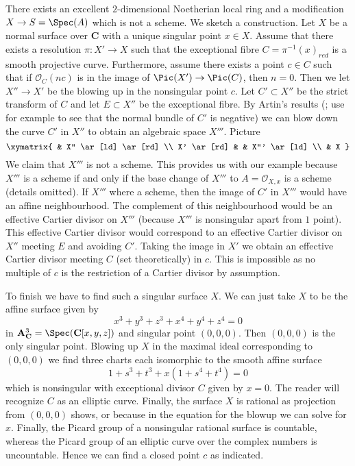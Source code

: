 \begin{example}
\label{example-not-blow-up}
There exists an excellent $2$-dimensional Noetherian local ring
and a modification $X \to S = \Spec(A)$ which is not a scheme.
We sketch a construction. Let $X$ be a normal surface over $\mathbf{C}$
with a unique singular point $x \in X$. Assume that there exists a
resolution $\pi : X' \to X$ such that the exceptional fibre
$C = \pi^{-1}(x)_{red}$ is a smooth projective curve. Furthermore, assume
there exists a point $c \in C$ such that if $\mathcal{O}_C(nc)$
is in the image of $\Pic(X') \to \Pic(C)$, then $n = 0$.
Then we let $X'' \to X'$ be the blowing up in the nonsingular point $c$.
Let $C' \subset X''$ be the strict transform of $C$ and let $E \subset X''$
be the exceptional fibre. By Artin's results
(\cite{ArtinII}; use for example \cite{Mumford-topology}
to see that the normal bundle of $C'$ is negative)
we can blow down the curve $C'$ in $X''$ to obtain an algebraic space $X'''$.
Picture
$$
\xymatrix{
& X'' \ar[ld] \ar[rd] \\
X' \ar[rd] &  & X''' \ar[ld] \\
& X
}
$$
We claim that $X'''$ is not a scheme. This provides us with our example
because $X'''$ is a scheme if and only if the base change of $X'''$
to $A = \mathcal{O}_{X, x}$ is a scheme (details omitted).
If $X'''$ where a scheme, then the image of $C'$ in $X'''$ would
have an affine neighbourhood. The complement of this neighbourhood
would be an effective Cartier divisor on $X'''$ (because $X'''$ is
nonsingular apart from $1$ point). This effective Cartier divisor would
correspond to an effective Cartier divisor on $X''$
meeting $E$ and avoiding $C'$. Taking the image in $X'$ we obtain
an effective Cartier divisor meeting $C$ (set theoretically) in $c$.
This is impossible as no multiple of $c$ is the restriction of a Cartier
divisor by assumption.

\medskip\noindent
To finish we have to find such a singular surface $X$. We can just take
$X$ to be the affine surface given by
$$
x^3 + y^3 + z^3 + x^4 + y^4 + z^4 = 0
$$
in $\mathbf{A}^3_\mathbf{C} = \Spec(\mathbf{C}[x, y, z])$ and singular point
$(0, 0, 0)$. Then $(0, 0, 0)$ is the only singular point. Blowing up $X$
in the maximal ideal corresponding to $(0, 0, 0)$ we find three charts each
isomorphic to the smooth affine surface
$$
1 + s^3 + t^3 + x(1 + s^4 + t^4) = 0
$$
which is nonsingular with exceptional divisor $C$ given by $x = 0$. The reader
will recognize $C$ as an elliptic curve. Finally, the surface $X$ is rational
as projection from $(0, 0, 0)$ shows, or because in the equation for the
blowup we can solve for $x$. Finally, the Picard group of a nonsingular
rational surface is countable, whereas the Picard group of an elliptic
curve over the complex numbers is uncountable. Hence we can find a closed
point $c$ as indicated.
\end{example}














